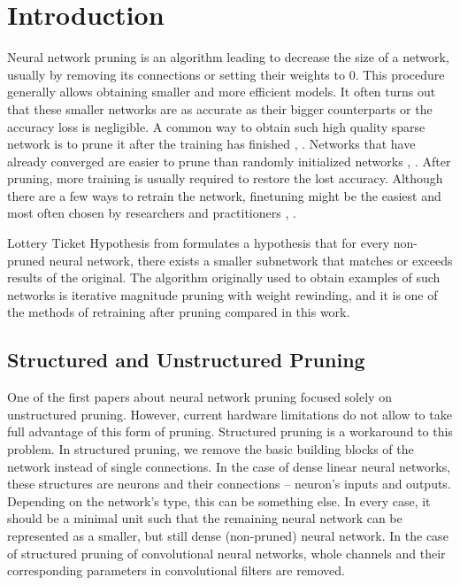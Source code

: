 \section{Introduction}

Neural network pruning is an algorithm leading to decrease the size of a network, usually by removing its connections or setting their weights to 0. 
This procedure generally allows obtaining smaller and more efficient models.
It often turns out that these smaller networks are as accurate as their bigger counterparts or the accuracy loss is negligible.
A common way to obtain such high quality sparse network is to prune it after the training has finished \cite{rethinking}, \cite{Frankle}.
Networks that have already converged are easier to prune than randomly initialized networks \cite{rethinking}, \cite{snip}.
After pruning, more training is usually required to restore the lost accuracy.
Although there are a few ways to retrain the network, finetuning might be the easiest and most often chosen by researchers and practitioners \cite{rethinking}, \cite{Renda}.

Lottery Ticket Hypothesis from \cite{Frankle} formulates a hypothesis that for every non-pruned neural network, there exists a smaller subnetwork that matches or exceeds results of the original. The algorithm originally used to obtain examples of such networks is iterative magnitude pruning with weight rewinding, and it is one of the methods of retraining after pruning compared in this work.

\subsection{Structured and Unstructured Pruning}

One of the first papers about neural network pruning \cite{optimal} focused solely on unstructured pruning.
However, current hardware limitations do not allow to take full advantage of this form of pruning.
Structured pruning is a workaround to this problem.
In structured pruning, we remove the basic building blocks of the network instead of single connections.
In the case of dense linear neural networks, these structures are neurons and their connections -- neuron's inputs and outputs.
Depending on the network's type, this can be something else.
In every case, it should be a minimal unit such that the remaining neural network can be represented as a smaller, but still dense (non-pruned) neural network.
In the case of structured pruning of convolutional neural networks, whole channels and their corresponding parameters in convolutional filters are removed.

